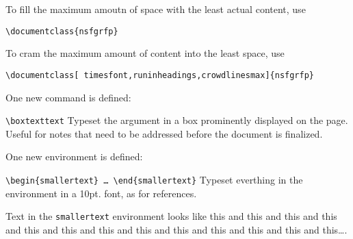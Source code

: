\documentclass[timesfont,runinheadings]{nsfgrfp}
\begin{document}
\vspace{0.5ex}

\noindent
To fill the maximum amoutn of space with the least actual content, use
\begin{quoting}
\texttt{\textbackslash documentclass\{nsfgrfp\}}
\end{quoting}
To cram the maximum amount of content into the least space, use
\begin{quoting}
\texttt{\textbackslash documentclass[%
timesfont,runinheadings,crowdlinesmax]\{nsfgrfp\}}
\end{quoting}

\vspace{0.5ex}

\noindent
One new command is defined:

\vspace{0.5ex}

\begin{compactdesc}

\item[\texttt{\textbackslash boxtext{text}}]
Typeset the argument in a box prominently displayed on the page.  Useful
for notes that need to be addressed before the document is finalized.

\end{compactdesc}

\vspace{0.5ex}

\noindent
One new environment is defined:

\begin{compactdesc}

\item[\texttt{\textbackslash begin\{smallertext\} \ldots\
	\textbackslash end\{smallertext\}}]
Typeset everthing in the environment in a 10pt. font, as for references.

\end{compactdesc}

\vspace{0.5ex}

\begin{smallertext}

\noindent
Text in the \texttt{smallertext} environment looks like this
and this
and this
and this
and this
and this
and this
and this
and this
and this
and this
and this
and this\ldots.

\end{smallertext}

\vspace{0.5ex}
\end{document}
